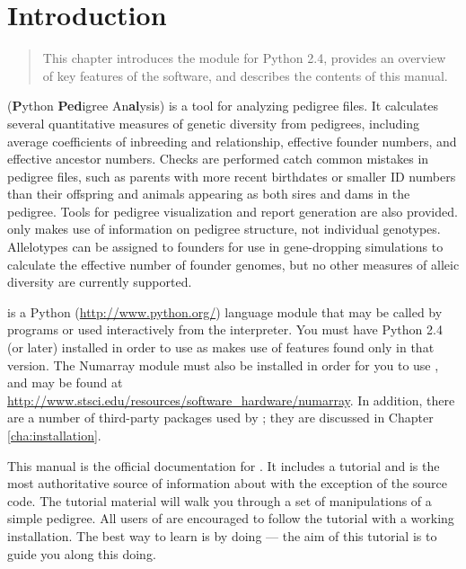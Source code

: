 \chapter{Introduction}
\label{cha:introduction}

\begin{quote}
This chapter introduces the \PyPedal{} module for Python 2.4, provides an overview of key features of the software, and describes the contents of this manual.
\end{quote}

\PyPedal{} (\textbf{P}ython \textbf{Ped}igree An\textbf{al}ysis) is a tool for analyzing pedigree files.  It calculates several quantitative measures of genetic diversity from pedigrees, including average coefficients of inbreeding and relationship, effective founder numbers, and effective ancestor numbers.  Checks are performed catch common mistakes in pedigree files, such as parents with more recent birthdates or smaller ID numbers than their offspring and animals appearing as both sires and dams in the pedigree.  Tools for pedigree visualization and report generation are also provided.  \PyPedal{} only makes use of information on pedigree structure, not individual genotypes.  Allelotypes can be assigned to founders for use in gene-dropping simulations to calculate the effective number of founder genomes, but no other measures of alleic diversity are currently supported.

\PyPedal{} is a Python (\url{http://www.python.org/}) language module that may be called by programs or used interactively from the interpreter.  You must have Python 2.4 (or later) installed in order to use \PyPedal{} as \PyPedal{} makes use of features found only in that version.  The Numarray module must also be installed in order for you to use \PyPedal{}, and may be found at \url{http://www.stsci.edu/resources/software_hardware/numarray}.  In addition, there are a number of third-party packages used by \PyPedal{}; they are discussed in Chapter \ref{cha:installation}.

This manual is the official documentation for \PyPedal{}. It includes a tutorial and is the most authoritative source of information about \PyPedal{} with the exception of the source code. The tutorial material will walk you through a set of manipulations of a simple pedigree.  All users of \PyPedal{} are encouraged to follow the tutorial with a working \PyPedal{} installation. The best way to learn is by doing --- the aim of this tutorial is to guide you along this doing.

